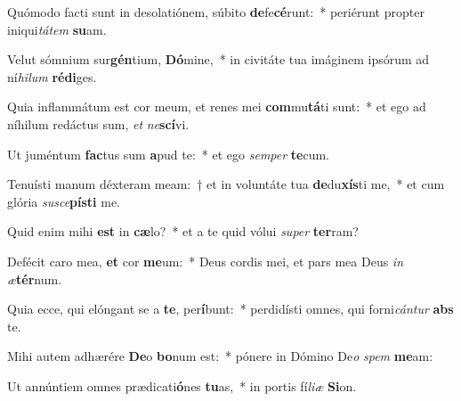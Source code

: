 \item Quómodo facti sunt in desolatiónem, súbito \textbf{de}fe\textbf{cé}runt:~* periérunt propter iniqui\textit{tá}\textit{tem} \textbf{su}am.
\item Velut sómnium sur\textbf{gén}tium, \textbf{Dó}mine,~* in civitáte tua imáginem ipsórum ad ní\textit{hi}\textit{lum} \textbf{réd}\textbf{i}ges.
\item Quia inflammátum est cor meum, et renes mei \textbf{com}mu\textbf{tá}ti sunt:~* et ego ad níhilum redáctus sum, \textit{et} \textit{ne}\textbf{scí}vi.
\item Ut juméntum \textbf{fac}tus sum \textbf{a}pud te:~* et ego \textit{sem}\textit{per} \textbf{te}cum.
\item Tenuísti manum déxteram meam:~† et in voluntáte tua \textbf{de}du\textbf{xís}ti me,~* et cum glória \textit{su}\textit{sce}\textbf{pís}\textbf{ti} me.
\item Quid enim mihi \textbf{est} in \textbf{cæ}lo?~* et a te quid vólui \textit{su}\textit{per} \textbf{ter}ram?
\item Defécit caro mea, \textbf{et} cor \textbf{me}um:~* Deus cordis mei, et pars mea Deus \textit{in} \textit{æ}\textbf{tér}num.
\item Quia ecce, qui elóngant se a \textbf{te}, per\textbf{í}bunt:~* perdidísti omnes, qui forni\textit{cán}\textit{tur} \textbf{abs} te.
\item Mihi autem adhærére \textbf{De}o \textbf{bo}num est:~* pónere in Dómino De\textit{o} \textit{spem} \textbf{me}am:
\item Ut annúntiem omnes prædicati\textbf{ó}nes \textbf{tu}as,~* in portis fí\textit{li}\textit{æ} \textbf{Si}on.

